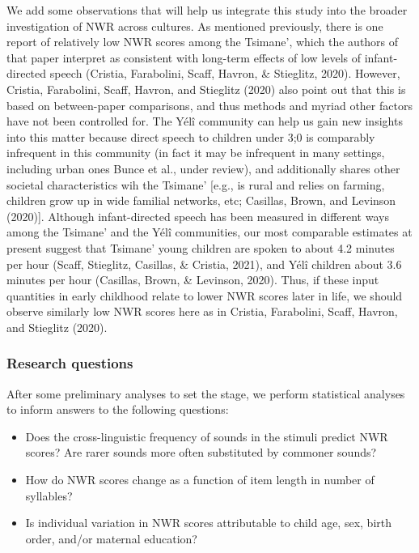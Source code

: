 \documentclass[
  american,
  ,man,floatsintext]{apa6}
\providecommand{\tightlist}{%
  \setlength{\itemsep}{0pt}\setlength{\parskip}{0pt}}
\begin{document}
We add some observations that will help us integrate this study into the broader investigation of NWR across cultures. As mentioned previously, there is one report of relatively low NWR scores among the Tsimane', which the authors of that paper interpret as consistent with long-term effects of low levels of infant-directed speech (Cristia, Farabolini, Scaff, Havron, \& Stieglitz, 2020). However, Cristia, Farabolini, Scaff, Havron, and Stieglitz (2020) also point out that this is based on between-paper comparisons, and thus methods and myriad other factors have not been controlled for. The Yélî community can help us gain new insights into this matter because direct speech to children under 3;0 is comparably infrequent in this community (in fact it may be infrequent in many settings, including urban ones Bunce et al., under review), and additionally shares other societal characteristics wih the Tsimane' {[}e.g., is rural and relies on farming, children grow up in wide familial networks, etc; Casillas, Brown, and Levinson (2020){]}. Although infant-directed speech has been measured in different ways among the Tsimane' and the Yélî communities, our most comparable estimates at present suggest that Tsimane' young children are spoken to about 4.2 minutes per hour (Scaff, Stieglitz, Casillas, \& Cristia, 2021), and Yélî children about 3.6 minutes per hour (Casillas, Brown, \& Levinson, 2020). Thus, if these input quantities in early childhood relate to lower NWR scores later in life, we should observe similarly low NWR scores here as in Cristia, Farabolini, Scaff, Havron, and Stieglitz (2020).

\hypertarget{research-questions}{%
\subsubsection{Research questions}\label{research-questions}}

After some preliminary analyses to set the stage, we perform statistical analyses to inform answers to the following questions:

\begin{itemize}
\tightlist
\item
  Does the cross-linguistic frequency of sounds in the stimuli predict NWR scores? Are rarer sounds more often substituted by commoner sounds?
\item
  How do NWR scores change as a function of item length in number of syllables?
\item
  Is individual variation in NWR scores attributable to child age, sex, birth order, and/or maternal education?
\end{itemize}
\end{document}
